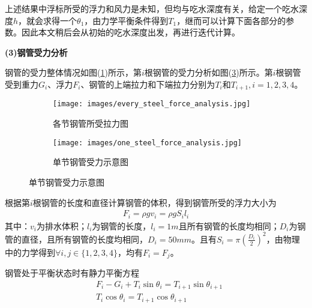             \par
            上述结果中浮标所受的浮力和风力是未知，但均与吃水深度有关，给定一个吃水深度$h$，就会求得一个$\theta_1$，由力学平衡条件得到$T_1$，继而可以计算下面各部分的参数。因此本文稍后会从初始的吃水深度出发，再进行迭代计算。
            \par
            \textbf{(3)钢管受力分析}
            \par
            钢管的受力整体情况如图(\ref{fig:各节钢管所受拉力图})所示，第$i$根钢管的受力分析如图(\ref{fig:单节钢管受力示意图})所示。第$i$根钢管受到重力$G_i$、浮力$F_i$、钢管的上端拉力和下端拉力分别为$T_i$和$T_{i+1},i = 1,2,3,4$。
           \begin{figure}[H]
                \centering
                \begin{subfigure}[b]{0.25\textwidth}
                    \texttt{[image: images/every\_steel\_force\_analysis.jpg]}
                    \caption{各节钢管所受拉力图}
                    \label{fig:各节钢管所受拉力图}
                \end{subfigure}
                \qquad
                \begin{subfigure}[b]{0.25\textwidth}
                    \texttt{[image: images/one\_steel\_force\_analysis.jpg]}
                    \caption{单节钢管受力示意图}
                    \label{fig:单节钢管受力示意图}
                \end{subfigure}
            \end{figure}
            \par
            根据第$i$根钢管的长度和直径计算钢管的体积，得到钢管所受的浮力大小为
            \begin{align*}
            F_i = \rho g v_i = \rho g S_i l_i
            \end{align*}
            其中：$v_i$为排水体积；$l_i$为钢管的长度，$l_i = 1m$且所有钢管的长度均相同；$D_i$为钢管的直径，且所有钢管的长度均相同，$D_i = 50mm $。且有$S_i = \pi \left( \frac{D_i}{2} \right)^2 $，由物理中的力学得到$\forall i,j\in \{1,2,3,4\}$，均有$F_i = F_j$。
            \par
            钢管处于平衡状态时有静力平衡方程
            \begin{align*}
            & F_i - G_i + T_i\sin \theta_i = T_{i+1}\sin \theta_{i+1}\\
            & T_{i}\cos \theta_i = T_{i+1}\cos \theta_{i+1}
            \end{align*}
